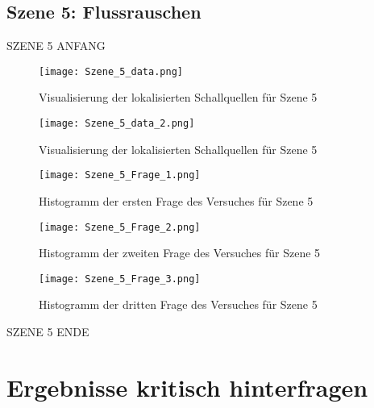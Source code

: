  \subsection{Szene 5: Flussrauschen}
 
 SZENE 5 ANFANG
   \begin{figure}[H]
\centering
\texttt{[image: Szene\_5\_data.png]}
\caption{Visualisierung der lokalisierten Schallquellen für Szene 5}
\label{fig:Szene_5_data}
\end{figure} 

   \begin{figure}[H]
\centering
\texttt{[image: Szene\_5\_data\_2.png]}
\caption{Visualisierung der lokalisierten Schallquellen für Szene 5}
\label{fig:Szene_5_data_2}
\end{figure} 

   \begin{figure}[H]
\centering
\texttt{[image: Szene\_5\_Frage\_1.png]}
\caption{Histogramm der ersten Frage des Versuches für Szene 5}
\label{fig:Szene_5_Frage1}
\end{figure} 

   \begin{figure}[H]
\centering
\texttt{[image: Szene\_5\_Frage\_2.png]}
\caption{Histogramm der zweiten Frage des Versuches für Szene 5}
\label{fig:Szene_5_Frage2}
\end{figure} 

   \begin{figure}[H]
\centering
\texttt{[image: Szene\_5\_Frage\_3.png]}
\caption{Histogramm der dritten Frage des Versuches für Szene 5}
\label{fig:Szene_5_Frage3}
\end{figure} 

SZENE 5 ENDE

 \section{Ergebnisse kritisch hinterfragen}
 







